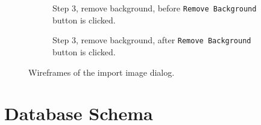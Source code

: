 \begin{figure}
\begin{subfigure}{0.45\textwidth}
        \caption{Step 3, remove background, before \texttt{Remove Background} button is clicked.}
        \label{fig:wireframes-import-remove-background-before}
    \end{subfigure}
    \hspace{1cm}
    \begin{subfigure}{0.45\textwidth}
        \centering
        \caption{Step 3, remove background, after \texttt{Remove Background} button is clicked.}
        \label{fig:wireframes-import-remove-background-after}
    \end{subfigure}
    \caption{Wireframes of the import image dialog.}
    \label{fig:wireframes-import-dialog}
\end{figure}

\section{Database Schema}


